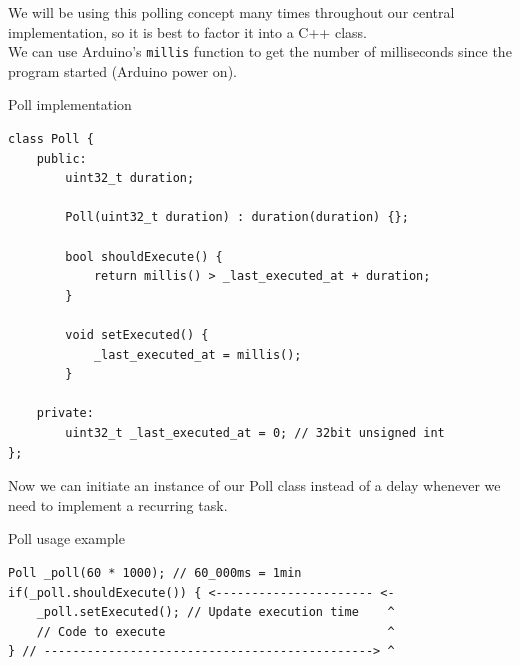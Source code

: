 We will be using this polling concept many times throughout our central implementation, so it is best to factor it into a C++ class. \\
We can use Arduino's \verb|millis| function to get the number of milliseconds since the program started (Arduino power on).

\begin{code}
\caption{Poll implementation}
\begin{verbatim}
class Poll {
    public:
        uint32_t duration;
    
        Poll(uint32_t duration) : duration(duration) {};
    
        bool shouldExecute() {
            return millis() > _last_executed_at + duration;
        }
    
        void setExecuted() {
            _last_executed_at = millis();
        }
    
    private:
        uint32_t _last_executed_at = 0; // 32bit unsigned int
};
\end{verbatim}
\end{code}

Now we can initiate an instance of our Poll class instead of a delay whenever we need to implement a recurring task.

\begin{code}
\caption{Poll usage example}
\begin{verbatim}
Poll _poll(60 * 1000); // 60_000ms = 1min
if(_poll.shouldExecute()) { <---------------------- <-
    _poll.setExecuted(); // Update execution time    ^
    // Code to execute                               ^
} // ----------------------------------------------> ^
\end{verbatim}
\end{code}

